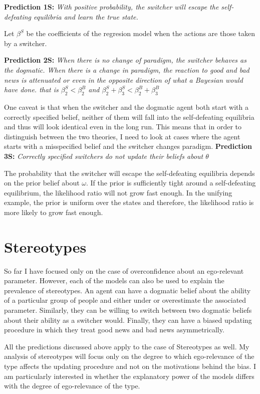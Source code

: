 \documentclass[
  12pt,
]{article}
\begin{document}
\textbf{Prediction 1S:} \emph{With positive probability, the switcher
will escape the self-defeating equilibria and learn the true state.}

Let \(\beta^S\) be the coefficients of the regresion model when the
actions are those taken by a switcher.

\textbf{Prediction 2S:} \emph{When there is no change of paradigm, the
switcher behaves as the dogmatic. When there is a change in paradigm,
the reaction to good and bad news is attenuated or even in the opposite
direction of what a Bayesian would have done. that is
\(\beta_2^S<\beta_2^B\) and
\(\beta_2^S + \beta_3^S<\beta_2^B+\beta_3^B\)}

One caveat is that when the switcher and the dogmatic agent both start
with a correctly specified belief, neither of them will fall into the
self-defeating equilibria and thus will look identical even in the long
run. This means that in order to distinguish between the two theories, I
need to look at cases where the agent starts with a misspecified belief
and the switcher changes paradigm. \textbf{Prediction 3S:}
\emph{Correctly specified switchers do not update their beliefs about
\(\theta\)}

The probability that the switcher will escape the self-defeating
equilibria depends on the prior belief about \(\omega\). If the prior is
sufficiently tight around a self-defeating equilibrium, the likelihood
ratio will not grow fast enough. In the unifying example, the prior is
uniform over the states and therefore, the likelihood ratio is more
likely to grow fast enough.

\hypertarget{stereotypes}{%
\section{Stereotypes}\label{stereotypes}}

So far I have focused only on the case of overconfidence about an
ego-relevant parameter. However, each of the models can also be used to
explain the prevalence of stereotypes. An agent can have a dogmatic
belief about the ability of a particular group of people and either
under or overestimate the associated parameter. Similarly, they can be
willing to switch between two dogmatic beliefs about their ability as a
switcher would. Finally, they can have a biased updating procedure in
which they treat good news and bad news asymmetrically.

All the predictions discussed above apply to the case of Stereotypes as
well. My analysis of stereotypes will focus only on the degree to which
ego-relevance of the type affects the updating procedure and not on the
motivations behind the bias. I am particularly interested in whether the
explanatory power of the models differs with the degree of ego-relevance
of the type.
\end{document}
